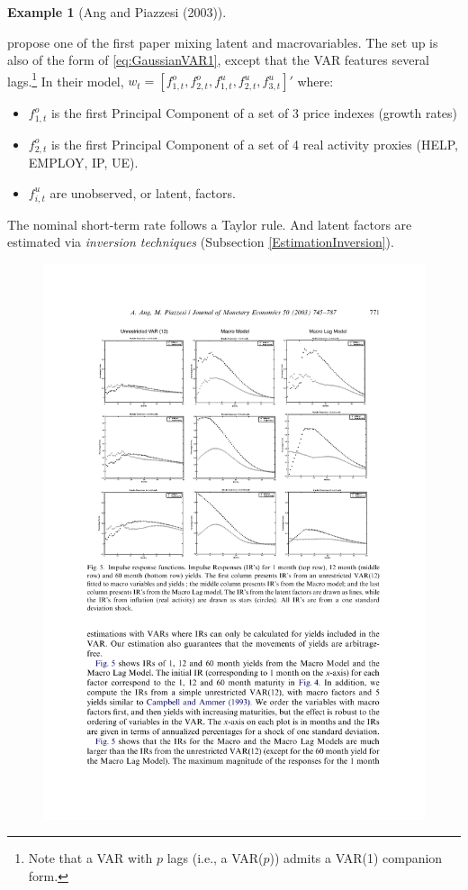 \documentclass[
  12pt,
]{book}
\providecommand{\tightlist}{%
  \setlength{\itemsep}{0pt}\setlength{\parskip}{0pt}}
\theoremstyle{definition}
\theoremstyle{definition}
\newtheorem{example}{Example}[chapter]
\theoremstyle{definition}
\theoremstyle{definition}
\theoremstyle{remark}
\begin{document}
\begin{example}[Ang and Piazzesi (2003)]
\protect\hypertarget{exm:AngPiazzesi}{}\label{exm:AngPiazzesi}

\citet{Ang_Piazzesi_2003} propose one of the first paper mixing latent and macrovariables. The set up is also of the form of \eqref{eq:GaussianVAR1}, except that the VAR features several lags.\footnote{Note that a VAR with \(p\) lags (i.e., a VAR(\(p\))) admits a VAR(1) companion form.} In their model, \(w_t = [f^{o}_{1,t},f^{o}_{2,t},f^{u}_{1,t},f^{u}_{2,t},f^{u}_{3,t}]'\) where:

\begin{itemize}
\tightlist
\item
  \(f^{o}_{1,t}\) is the first Principal Component of a set of 3 price indexes (growth rates)
\item
  \(f^{o}_{2,t}\) is the first Principal Component of a set of 4 real activity proxies (HELP, EMPLOY, IP, UE).
\item
  \(f^{u}_{i,t}\) are unobserved, or latent, factors.
\end{itemize}

The nominal short-term rate follows a Taylor rule. And latent factors are estimated via \emph{inversion techniques} (Subsection \ref{EstimationInversion}).

\begin{figure}

{\centering \includegraphics[width=0.95\linewidth]{figures/AngPiazzesi1} 

}
\end{figure}
\end{example}
\end{document}
